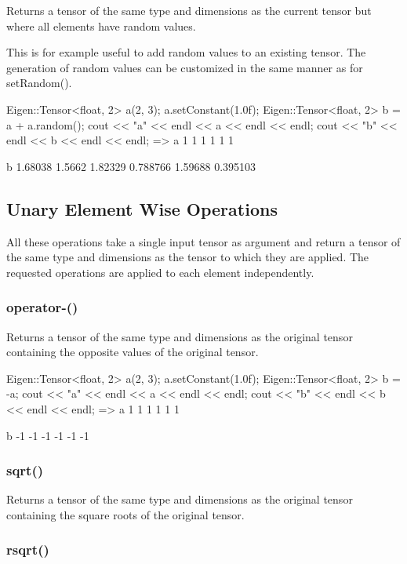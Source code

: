 Returns a tensor of the same type and dimensions as the current tensor but where all elements have random values.

This is for example useful to add random values to an existing tensor. The generation of random values can be customized in the same manner as for {\ttfamily set\+Random()}. \begin{DoxyVerb}Eigen::Tensor<float, 2> a(2, 3);
a.setConstant(1.0f);
Eigen::Tensor<float, 2> b = a + a.random();
cout << "a" << endl << a << endl << endl;
cout << "b" << endl << b << endl << endl;
=>
a
1 1 1
1 1 1

b
1.68038   1.5662  1.82329
0.788766  1.59688 0.395103
\end{DoxyVerb}


\subsection*{Unary Element Wise Operations}

All these operations take a single input tensor as argument and return a tensor of the same type and dimensions as the tensor to which they are applied. The requested operations are applied to each element independently.

\subsubsection*{operator-\/()}

Returns a tensor of the same type and dimensions as the original tensor containing the opposite values of the original tensor. \begin{DoxyVerb}Eigen::Tensor<float, 2> a(2, 3);
a.setConstant(1.0f);
Eigen::Tensor<float, 2> b = -a;
cout << "a" << endl << a << endl << endl;
cout << "b" << endl << b << endl << endl;
=>
a
1 1 1
1 1 1

b
-1 -1 -1
-1 -1 -1
\end{DoxyVerb}


\subsubsection*{sqrt()}

Returns a tensor of the same type and dimensions as the original tensor containing the square roots of the original tensor.

\subsubsection*{rsqrt()}

